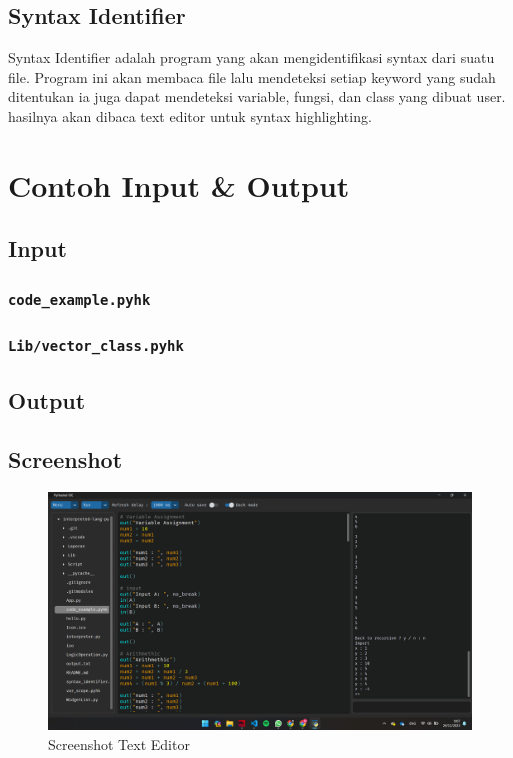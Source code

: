 \documentclass{article}
\begin{document}
\subsection{Syntax Identifier}
Syntax Identifier adalah program yang akan mengidentifikasi syntax dari suatu file. Program ini akan membaca file lalu mendeteksi setiap keyword yang sudah
ditentukan ia juga dapat mendeteksi variable, fungsi, dan class yang dibuat user. hasilnya akan dibaca text editor untuk 
syntax highlighting.
\section{Contoh Input \& Output}
\subsection{Input}
\subsubsection{\texttt{code\_example.pyhk}}

\subsubsection{\texttt{Lib/vector\_class.pyhk}}

\subsection{Output}

\subsection{Screenshot}
\begin{figure}[H]
    \includegraphics[width=\textwidth]{image1.png}
    \caption{Screenshot Text Editor}
\end{figure}
\end{document}
